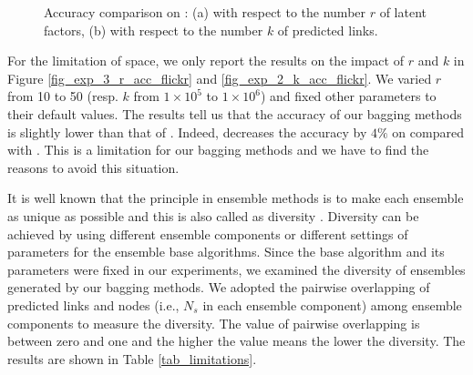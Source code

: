 \begin{figure}[tb!]
  \centering
  \vspace{1ex}
  \hspace{-2ex}
  \vspace{-2ex}
  \caption{Accuracy comparison on \Flickr: (a) with respect to the number $r$ of latent factors,
  (b) with respect to the number $k$ of predicted links.}\label{fig_exp_5}
  \vspace{-3ex}
\end{figure}

For the limitation of space, we only report the results on the impact of $r$ and $k$
in Figure \ref{fig_exp_3_r_acc_flickr} and \ref{fig_exp_2_k_acc_flickr}.
We varied $r$ from 10 to 50 (resp. $k$ from $1\times 10^5$ to $1\times 10^6$)
and fixed other parameters to their default values. The results tell us that
the accuracy of our bagging methods is slightly lower than that of \NMF.
Indeed, \Biased decreases the accuracy by $4\%$ on \Flickr compared with \NMF.
This is a limitation for our bagging methods and we have to find
the reasons to avoid this situation.


It is well known that the principle in ensemble methods is to make each ensemble as
unique as possible and this is also called as diversity \cite{zhzhou}. Diversity can
be achieved by using different ensemble components or different settings of parameters for the ensemble base
algorithms. Since the base algorithm and its parameters were fixed in our experiments, we examined
the diversity of ensembles generated by our bagging methods. We adopted the pairwise
overlapping of predicted links and nodes (i.e., $N_s$ in each ensemble component)
among ensemble components to measure the diversity. The value of pairwise overlapping is between
zero and one and the higher the value means the lower the diversity.
The results are shown in Table \ref{tab_limitations}.

